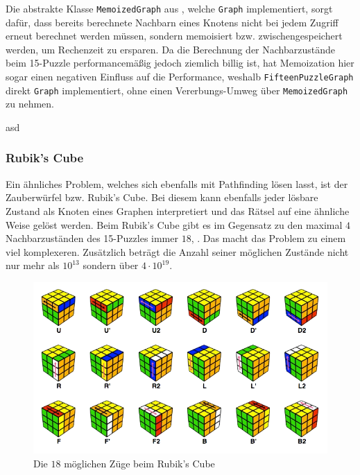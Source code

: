                 
                
                Die abstrakte Klasse \lstinline{MemoizedGraph} aus , welche \lstinline{Graph} implementiert, sorgt dafür, dass bereits berechnete Nachbarn eines Knotens nicht bei jedem Zugriff erneut berechnet werden müssen, sondern memoisiert bzw. zwischengespeichert werden, um Rechenzeit zu ersparen. Da die Berechnung der Nachbarzustände beim 15-Puzzle performancemäßig jedoch ziemlich billig ist, hat Memoization hier sogar einen negativen Einfluss auf die Performance, weshalb \lstinline{FifteenPuzzleGraph} direkt \lstinline{Graph} implementiert, ohne einen Vererbungs-Umweg über \lstinline{MemoizedGraph} zu nehmen. \cite{EZ:Web59}

                


                asd

            \subsubsection{Rubik's Cube}

                Ein ähnliches Problem, welches sich ebenfalls mit Pathfinding lösen lasst, ist der Zauberwürfel bzw. Rubik's Cube. Bei diesem kann ebenfalls jeder lösbare Zustand als Knoten eines Graphen interpretiert und das Rätsel auf eine ähnliche Weise gelöst werden. Beim Rubik's Cube gibt es im Gegensatz zu den maximal $4$ Nachbarzuständen des 15-Puzzles immer $18$, . Das macht das Problem zu einem viel komplexeren. Zusätzlich beträgt die Anzahl seiner möglichen Zustände nicht nur mehr als $10^{13}$ sondern über $4 \cdot 10^{19}$.
                
                \begin{figure}
                    \centering
                    \includegraphics[width=0.75\linewidth]{images/cube-neighbors.png}
                    \caption{Die $18$ möglichen Züge beim Rubik's Cube\\\cite{EZ:Web61}}
                    \label{fig:cube-neighbors}
                \end{figure}
                
